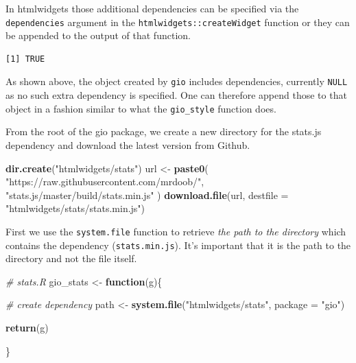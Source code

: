 \documentclass[
  10pt,
]{krantz}
\makeatletter
\newenvironment{Shaded}{\begin{snugshade}}{\end{snugshade}}
\newcommand{\CommentTok}[1]{\textcolor[rgb]{0.37,0.37,0.37}{\textit{#1}}}
\newcommand{\ControlFlowTok}[1]{\textcolor[rgb]{0.27,0.27,0.27}{\textbf{#1}}}
\newcommand{\DataTypeTok}[1]{\textcolor[rgb]{0.27,0.27,0.27}{#1}}
\newcommand{\KeywordTok}[1]{\textcolor[rgb]{0.27,0.27,0.27}{\textbf{#1}}}
\newcommand{\NormalTok}[1]{#1}
\newcommand{\OperatorTok}[1]{\textcolor[rgb]{0.43,0.43,0.43}{\textbf{#1}}}
\newcommand{\StringTok}[1]{\textcolor[rgb]{0.5,0.5,0.5}{#1}}
\newenvironment{kframe}{%
\medskip{}
\setlength{\fboxsep}{.8em}
 \def\at@end@of@kframe{}%
 \ifinner\ifhmode%
  \def\at@end@of@kframe{\end{minipage}}%
  \begin{minipage}{\columnwidth}%
 \fi\fi%
 \def\FrameCommand##1{\hskip\@totalleftmargin \hskip-\fboxsep
 \colorbox{shadecolor}{##1}\hskip-\fboxsep
     \hskip-\linewidth \hskip-\@totalleftmargin \hskip\columnwidth}%
 \MakeFramed {\advance\hsize-\width
   \@totalleftmargin\z@ \linewidth\hsize
   \@setminipage}}%
 {\par\unskip\endMakeFramed%
 \at@end@of@kframe}
\renewenvironment{Shaded}{\begin{kframe}}{\end{kframe}}
\makeatother
\begin{document}
In htmlwidgets those additional dependencies can be specified via the \texttt{dependencies} argument in the \texttt{htmlwidgets::createWidget} function or they can be appended to the output of that function.

\begin{Shaded}
\end{Shaded}

\begin{verbatim}
[1] TRUE
\end{verbatim}

As shown above, the object created by \texttt{gio} includes dependencies, currently \texttt{NULL} as no such extra dependency is specified. One can therefore append those to that object in a fashion similar to what the \texttt{gio\_style} function does.

From the root of the gio package, we create a new directory for the stats.js dependency and download the latest version from Github.

\begin{Shaded}
\begin{Highlighting}[]
\KeywordTok{dir.create}\NormalTok{(}\StringTok{"htmlwidgets/stats"}\NormalTok{)}
\NormalTok{url <{-}}\StringTok{ }\KeywordTok{paste0}\NormalTok{(}
  \StringTok{"https://raw.githubusercontent.com/mrdoob/"}\NormalTok{,}
  \StringTok{"stats.js/master/build/stats.min.js"}
\NormalTok{)}
\KeywordTok{download.file}\NormalTok{(url, }\DataTypeTok{destfile =} \StringTok{"htmlwidgets/stats/stats.min.js"}\NormalTok{)}
\end{Highlighting}
\end{Shaded}

First we use the \texttt{system.file} function to retrieve \emph{the path to the directory} which contains the dependency (\texttt{stats.min.js}). It's important that it is the path to the directory and not the file itself.

\begin{Shaded}
\begin{Highlighting}[]
\CommentTok{\# stats.R}
\NormalTok{gio\_stats <{-}}\StringTok{ }\ControlFlowTok{function}\NormalTok{(g)\{}

  \CommentTok{\# create dependency}
\NormalTok{  path <{-}}\StringTok{ }\KeywordTok{system.file}\NormalTok{(}\StringTok{"htmlwidgets/stats"}\NormalTok{, }\DataTypeTok{package =} \StringTok{"gio"}\NormalTok{)}

  \KeywordTok{return}\NormalTok{(g)}

\NormalTok{\}}
\end{Highlighting}
\end{Shaded}
\end{document}
